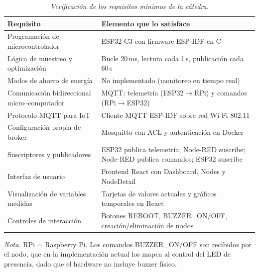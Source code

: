 \begin{table}[htbp]
  \caption{\textit{Verificación de los requisitos mínimos de la cátedra.}}
  \label{tab:requisitos}
  \centering
  \small
  \begin{tabularx}{\textwidth}{@{}p{5.5cm}X@{}}
    \toprule
    \textbf{Requisito} & \textbf{Elemento que lo satisface} \\
    \midrule
    Programación de microcontrolador & ESP32-C3 con firmware ESP-IDF en C \\
    Lógica de muestreo y optimización & Bucle 20\,ms, lectura cada 1\,s, publicación cada 60\,s \\
    Modos de ahorro de energía & No implementado (monitoreo en tiempo real) \\
    Comunicación bidireccional micro--computador & MQTT: telemetría (ESP32$\rightarrow$RPi) y comandos (RPi$\rightarrow$ESP32) \\
    Protocolo MQTT para IoT & Cliente MQTT ESP-IDF sobre red Wi-Fi 802.11 \\
    Configuración propia de broker & Mosquitto con ACL y autenticación en Docker \\
    Suscriptores y publicadores & ESP32 publica telemetría; Node-RED suscribe; Node-RED publica comandos; ESP32 suscribe \\
    Interfaz de usuario & Frontend React con Dashboard, Nodes y NodeDetail \\
    Visualización de variables medidas & Tarjetas de valores actuales y gráficos temporales en React \\
    Controles de interacción & Botones REBOOT, BUZZER\_ON/OFF, creación/eliminación de nodos \\
    \bottomrule
  \end{tabularx}
  \vspace{4pt}

  \noindent\textit{Nota.} RPi = Raspberry Pi. Los comandos BUZZER\_ON/OFF son
  recibidos por el nodo, que en la implementación actual los mapea al control del LED
  de presencia, dado que el hardware no incluye buzzer físico.
\end{table}

